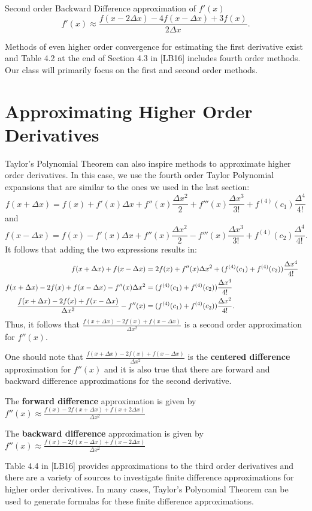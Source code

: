 \documentclass[twoside]{article}
\renewcommand{\cite}[1]{[#1]}
\def\ds{\displaystyle}
\begin{document}
Second order Backward Difference approximation of $\ds f'(x)$
$$f'(x) \approx \frac {f(x-2\Delta x) - 4f(x - \Delta x) + 3 f(x)}{2\Delta x}.$$

Methods of even higher order convergence for estimating the first derivative exist and Table 4.2 at the end of Section 4.3  in \cite{LB16} includes fourth order methods. Our class will primarily focus on the first and second order methods. 

\section{Approximating Higher Order Derivatives}
Taylor's Polynomial Theorem can also inspire methods to approximate higher order derivatives. In this case, we use the fourth order Taylor Polynomial expansions that are similar to the ones we used in the last section: 
$$f(x + \Delta x) = f(x) + f'(x) \Delta x + f''(x) \frac {\Delta x^2}2 + f'''(x) \frac {\Delta x^3}{3!} + f^{(4)}(c_1) \frac {\Delta^4}{4!}$$
and
$$f(x - \Delta x) = f(x) - f'(x) \Delta x + f''(x) \frac {\Delta x^2}2 - f'''(x) \frac {\Delta x^3}{3!} + f^{(4)}(c_2) \frac {\Delta^4}{4!}.$$
It follows that adding the two expressions results in:
\begin{align*}
 f(x + \Delta x) + f(x - \Delta x) &= 2f(x) + f''(x) \Delta x^2 +  (f^{(4)}(c_1)+f^{(4)}(c_2)) \frac {\Delta x^4}{4!}\cr
  f(x + \Delta x) - 2f(x)+ f(x - \Delta x) - f''(x)\Delta x^2 &=  (f^{(4)}(c_1)+f^{(4)}(c_2)) \frac {\Delta x^4}{4!}  \cr
 \frac {f(x + \Delta x) - 2f(x)+ f(x - \Delta x)}{\Delta x^2} - f''(x) &=   (f^{(4)}(c_1)+f^{(4)}(c_2)) \frac {\Delta x^2}{4!}.
\end{align*}
Thus, it follows that $\ds \frac {f(x + \Delta x) - 2f(x)+ f(x - \Delta x)}{\Delta x^2} $ is a second order approximation for $\ds f''(x)$. 

One should note that $\ds \frac {f(x + \Delta x) - 2f(x)+ f(x - \Delta x)}{\Delta x^2} $ is the {\bf centered difference} approximation for $\ds f''(x)$ and it is also true that there are forward and backward difference approximations for the second derivative. 

The {\bf forward difference} approximation is given by
$\ds f''(x) \approx \frac {f(x) - 2f(x  + \Delta x)+ f(x + 2 \Delta x)}{\Delta x^2} $ 

The {\bf backward difference} approximation is given by
$\ds f''(x) \approx \frac {f(x) - 2f(x  - \Delta x)+ f(x - 2 \Delta x)}{\Delta x^2} $ 

Table 4.4 in \cite{LB16} provides approximations to the third order derivatives and there are a variety of sources to investigate finite difference approximations for higher order derivatives. In many cases, Taylor's Polynomial Theorem can be used to generate formulas for these finite difference approximations. 
\end{document}
